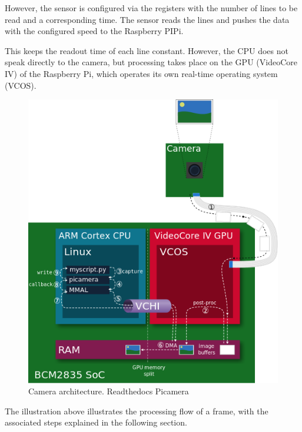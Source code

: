 \documentclass[12pt, a4paper]{report}
\begin{document}
However, the sensor is configured via the registers with the number of lines to be read and a corresponding time. The sensor reads the lines and pushes the data with the configured speed to the Raspberry PIPi.

This keeps the readout time of each line constant. However, the CPU does not speak directly to the camera, but processing takes place on the GPU (VideoCore IV) of the Raspberry Pi, which operates its own real-time operating system (VCOS).

\bigskip
\noindent
\begin{figure}
\centering
\includegraphics[scale=0.6]{Images/camera_architecture.png}

\caption{Camera architecture. Readthedocs Picamera}
\end{figure}



\bigskip

The illustration above illustrates the processing flow of a frame, with the associated steps explained in the following section.
\end{document}
